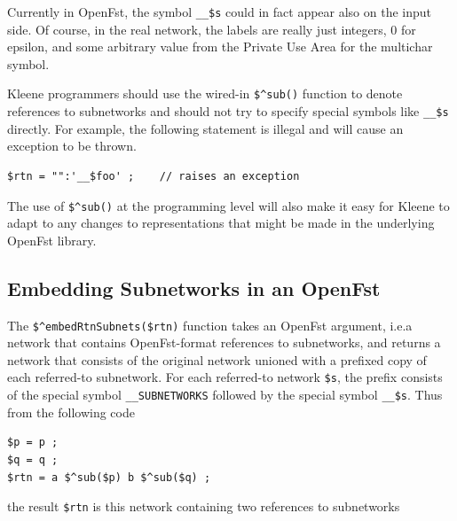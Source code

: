 \noindent
Currently in OpenFst, the symbol \verb!__$s! could in fact appear also on
the input side.  Of course, in the real network, the labels are really
just integers, 0 for epsilon, and some arbitrary value from the Private
Use Area for the multichar symbol.

Kleene programmers should use the wired-in \verb!$^sub()! function to
denote references to subnetworks and should not try to specify special
symbols like \verb!__$s! directly.  For example, the following statement
is illegal and will cause an exception to be thrown.

\begin{Verbatim}[fontsize=\small]
$rtn = "":'__$foo' ;    // raises an exception
\end{Verbatim}

\noindent
The use of \verb!$^sub()! at the programming level will also make it easy
for Kleene to adapt to any changes to  representations that
might be made in the underlying OpenFst library.

\subsection{Embedding Subnetworks in an OpenFst }

The \verb!$^embedRtnSubnets($rtn)! function takes an OpenFst 
argument, i.e.\@ a network that contains OpenFst-format references to
subnetworks, and returns a network that consists of the original network
unioned with a prefixed copy of each referred-to subnetwork.  For each
referred-to network \verb!$s!, the prefix consists of the special symbol
\verb!__SUBNETWORKS! followed by the special symbol \verb!__$s!.  Thus
from the following code

\begin{Verbatim}[fontsize=\small]
$p = p ;
$q = q ;
$rtn = a $^sub($p) b $^sub($q) ;
\end{Verbatim}

\noindent
the result \verb!$rtn! is this network containing two references to subnetworks

